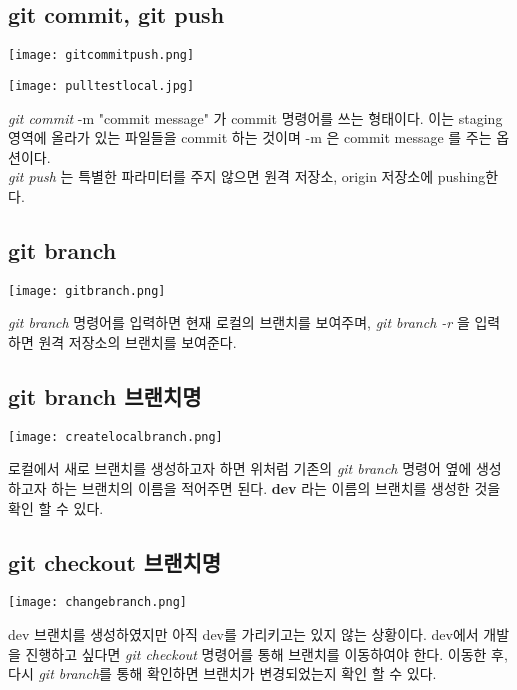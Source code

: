 \documentclass[11pt]{article}
\begin{document}
	\subsection{git commit, git push}
	\begin{center}\texttt{[image: gitcommitpush.png]}\end{center}
	\begin{center}\texttt{[image: pulltestlocal.jpg]}\end{center}
	\textit{git commit} -m "commit message" 가 commit 명령어를 쓰는 형태이다. 이는 staging 영역에 올라가 있는 파일들을 commit 하는 것이며 -m 은 commit message 를 주는 옵션이다. 
	\\\textit{git push} 는 특별한 파라미터를 주지 않으면 원격 저장소, origin 저장소에 pushing한다. 
	
	\subsection{git branch}
	\begin{center}\texttt{[image: gitbranch.png]}\end{center}
	\textit{git branch} 명령어를 입력하면 현재 로컬의 브랜치를 보여주며, \textit{git branch -r} 을 입력하면 원격 저장소의 브랜치를 보여준다. 
	
	\subsection{git branch 브랜치명}
	\begin{center}\texttt{[image: createlocalbranch.png]}\end{center}
	로컬에서 새로 브랜치를 생성하고자 하면 위처럼 기존의 \textit{git branch} 명령어 옆에 생성하고자 하는 브랜치의 이름을 적어주면 된다. \textbf{dev} 라는 이름의 브랜치를 생성한 것을 확인 할 수 있다.
	
	\subsection{git checkout 브랜치명}
	\begin{center}\texttt{[image: changebranch.png]}\end{center}
	dev 브랜치를 생성하였지만 아직 dev를 가리키고는 있지 않는 상황이다. dev에서 개발을 진행하고 싶다면 \textit{git checkout} 명령어를 통해 브랜치를 이동하여야 한다. 이동한 후, 다시 \textit{git branch}를 통해 확인하면 브랜치가 변경되었는지 확인 할 수 있다.
	
\end{document}
